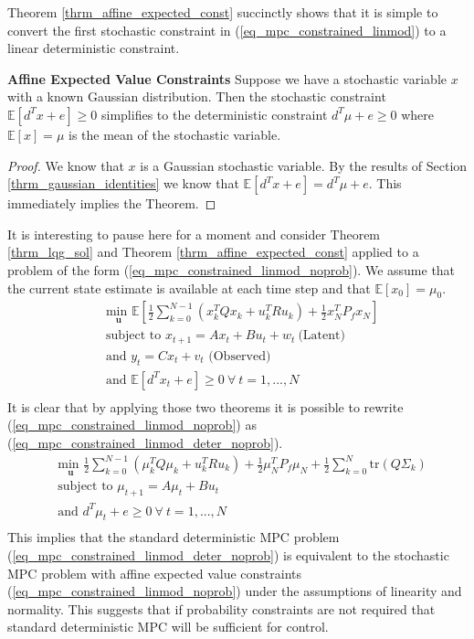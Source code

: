 Theorem \ref{thrm_affine_expected_const} succinctly shows that it is simple to convert the first stochastic constraint in (\ref{eq_mpc_constrained_linmod}) to a linear deterministic constraint.
\begin{thrm}
\textbf{Affine Expected Value Constraints} Suppose we have a stochastic variable $x$ with a known Gaussian distribution. Then the stochastic constraint $\mathbb{E}[d^Tx + e] \geq 0$ simplifies to the deterministic constraint $d^T\mu + e \geq 0$ where $\mathbb{E}[x]= \mu$ is the mean of the stochastic variable.
\label{thrm_affine_expected_const}
\end{thrm}
\begin{proof}
We know that $x$ is a Gaussian stochastic variable. By the results of Section \ref{thrm_gaussian_identities} we know that $\mathbb{E}[d^Tx + e] =d^T\mu + e$. This immediately implies the Theorem.
\end{proof}
It is interesting to pause here for a moment and consider Theorem \ref{thrm_lqg_sol} and Theorem \ref{thrm_affine_expected_const} applied to a problem of the form (\ref{eq_mpc_constrained_linmod_noprob}). We assume that the current state estimate is available at each time step and that $\mathbb{E}[x_0]=\mu_0$.
\begin{equation}
\begin{aligned}
&\underset{\mathbf{u}}{\text{min }} \mathbb{E}\left[ \frac{1}{2}\sum_{k=0}^{N-1} \left( x_k^TQx_k + u_k^TRu_k \right) + \frac{1}{2}x_N^TP_fx_N \right] \\
& \text{subject to } x_{t+1}=Ax_t+Bu_t + w_t~\text{(Latent)} \\
& \text{and } y_{t}= Cx_t + v_t \text{ (Observed)}\\
& \text{and } \mathbb{E}[d^Tx_t + e] \geq 0 ~\forall ~t=1,...,N \\
\end{aligned}
\label{eq_mpc_constrained_linmod_noprob}
\end{equation}
It is clear that by applying those two theorems it is possible to rewrite (\ref{eq_mpc_constrained_linmod_noprob}) as (\ref{eq_mpc_constrained_linmod_deter_noprob}).
\begin{equation}
\begin{aligned}
&\underset{\mathbf{u}}{\text{min }} \frac{1}{2}\sum_{k=0}^{N-1} \left( \mu_k^TQ\mu_k + u_k^TRu_k \right) + \frac{1}{2}\mu_N^TP_f\mu_N + \frac{1}{2}\sum_{k=0}^N \text{tr}(Q\Sigma_k) \\
& \text{subject to } \mu_{t+1}=A\mu_t + Bu_t \\
& \text{and } d^T\mu_t + e \geq 0 ~\forall ~t=1,...,N\\
\end{aligned}
\label{eq_mpc_constrained_linmod_deter_noprob}
\end{equation}
This implies that the standard deterministic MPC problem (\ref{eq_mpc_constrained_linmod_deter_noprob}) is equivalent to the stochastic MPC problem with affine expected value constraints (\ref{eq_mpc_constrained_linmod_noprob}) under the assumptions of linearity and normality. This suggests that if probability constraints are not required that standard deterministic MPC will be sufficient for control.

